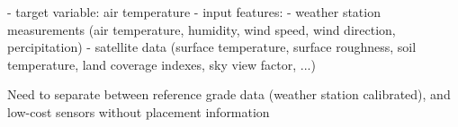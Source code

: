 - target variable: air temperature
- input features:
    - weather station measurements (air temperature, humidity, wind speed, wind direction, percipitation)
    - satellite data (surface temperature, surface roughness, soil temperature, land coverage indexes, sky view factor, ...)

    Need to separate between reference grade data (weather station calibrated), and low-cost sensors without placement information





